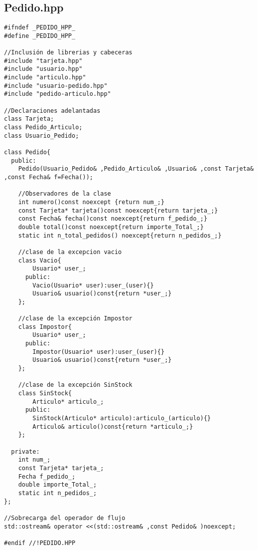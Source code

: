 \subsection{Pedido.hpp}
\begin{verbatim}
#ifndef _PEDIDO_HPP_
#define _PEDIDO_HPP_

//Inclusión de librerias y cabeceras
#include "tarjeta.hpp"
#include "usuario.hpp"
#include "articulo.hpp"
#include "usuario-pedido.hpp"
#include "pedido-articulo.hpp"

//Declaraciones adelantadas
class Tarjeta;
class Pedido_Articulo;
class Usuario_Pedido;

class Pedido{
  public:
    Pedido(Usuario_Pedido& ,Pedido_Articulo& ,Usuario& ,const Tarjeta& ,const Fecha& f=Fecha());
    
    //Observadores de la clase
    int numero()const noexcept {return num_;}
    const Tarjeta* tarjeta()const noexcept{return tarjeta_;}
    const Fecha& fecha()const noexcept{return f_pedido_;}
    double total()const noexcept{return importe_Total_;}
    static int n_total_pedidos() noexcept{return n_pedidos_;}

    //clase de la excepcion vacio
    class Vacio{
        Usuario* user_;
      public:
        Vacio(Usuario* user):user_(user){}
        Usuario& usuario()const{return *user_;}
    };

    //clase de la excepción Impostor
    class Impostor{
        Usuario* user_;
      public:
        Impostor(Usuario* user):user_(user){}
        Usuario& usuario()const{return *user_;}
    };

    //clase de la excepción SinStock
    class SinStock{
        Articulo* articulo_;
      public:
        SinStock(Articulo* articulo):articulo_(articulo){}
        Articulo& articulo()const{return *articulo_;}
    };

  private:
    int num_;
    const Tarjeta* tarjeta_;
    Fecha f_pedido_;
    double importe_Total_;
    static int n_pedidos_;
};

//Sobrecarga del operador de flujo
std::ostream& operator <<(std::ostream& ,const Pedido& )noexcept;

#endif //!PEDIDO.HPP
\end{verbatim}
